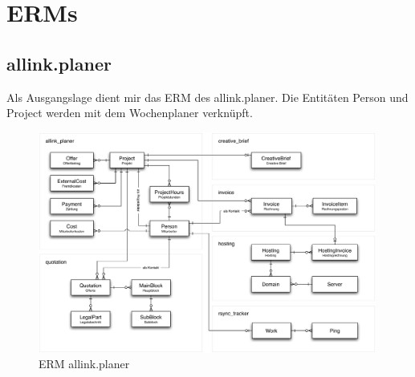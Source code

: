 \section{ERMs}
\subsection{allink.planer}
Als Ausgangslage dient mir das ERM des allink.planer. Die Entitäten Person und Project werden mit dem Wochenplaner verknüpft.

\begin{figure}[!ht]
\begin{center}
\includegraphics[width=0.99\textwidth,angle=0]{./bilder/erm_planer.pdf}
\caption[]{ERM allink.planer\footnotemark}
\end{center}
\end{figure}

\clearpage


